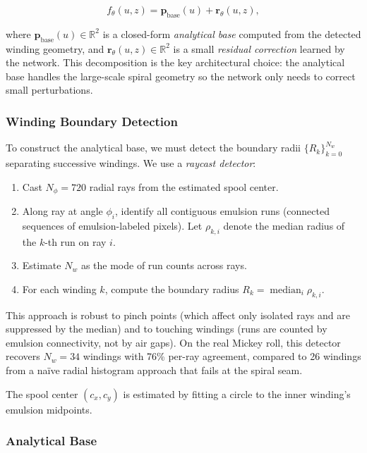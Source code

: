 \documentclass[11pt,a4paper]{article}
\newcommand{\R}{\mathbb{R}}
\begin{document}
\begin{equation}
    f_\theta(u, z) = \bm{p}_{\text{base}}(u) + \bm{r}_\theta(u, z),
    \label{eq:residual}
\end{equation}

where $\bm{p}_{\text{base}}(u) \in \R^2$ is a closed-form \emph{analytical base} computed from the detected winding geometry, and $\bm{r}_\theta(u, z) \in \R^2$ is a small \emph{residual correction} learned by the network. This decomposition is the key architectural choice: the analytical base handles the large-scale spiral geometry so the network only needs to correct small perturbations.

\subsubsection{Winding Boundary Detection}
\label{sec:raycast}

To construct the analytical base, we must detect the boundary radii $\{R_k\}_{k=0}^{N_w}$ separating successive windings. We use a \emph{raycast detector}:

\begin{enumerate}
    \item Cast $N_\phi = 720$ radial rays from the estimated spool center.
    \item Along ray at angle $\phi_i$, identify all contiguous emulsion runs (connected sequences of emulsion-labeled pixels). Let $\rho_{k,i}$ denote the median radius of the $k$-th run on ray $i$.
    \item Estimate $N_w$ as the mode of run counts across rays.
    \item For each winding $k$, compute the boundary radius $R_k = \operatorname{median}_i \rho_{k,i}$.
\end{enumerate}

This approach is robust to pinch points (which affect only isolated rays and are suppressed by the median) and to touching windings (runs are counted by emulsion connectivity, not by air gaps). On the real Mickey roll, this detector recovers $N_w = 34$ windings with 76\% per-ray agreement, compared to 26 windings from a na\"ive radial histogram approach that fails at the spiral seam.

The spool center $(c_x, c_y)$ is estimated by fitting a circle to the inner winding's emulsion midpoints.

\subsubsection{Analytical Base}
\end{document}
